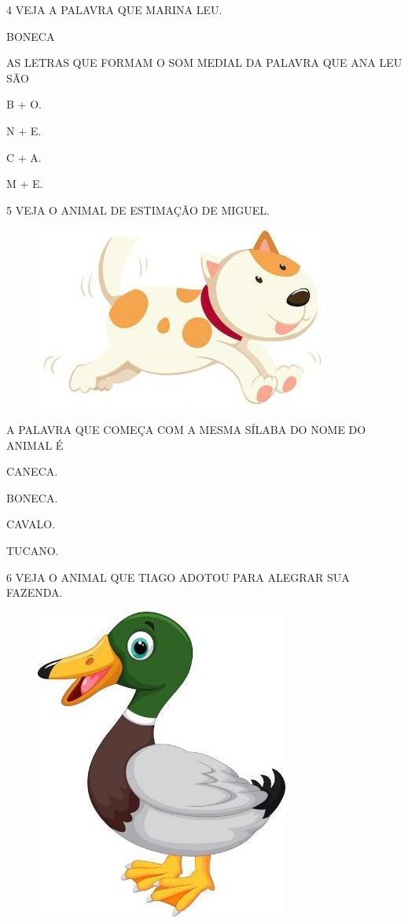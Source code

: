\num{4} VEJA A PALAVRA QUE MARINA LEU.

\begin{myquote}
\centering\large{BONECA}
\end{myquote}

AS LETRAS QUE FORMAM O SOM MEDIAL DA PALAVRA QUE ANA LEU SÃO

\begin{multicols}{4}
\begin{escolha}[itemsep=0pt]
\item B + O.

\item N + E.

\item C + A.

\item M + E.
\end{escolha}
\end{multicols}

\num{5} VEJA O ANIMAL DE ESTIMAÇÃO DE MIGUEL.

\begin{figure}[H]
\centering
\includegraphics[width=.55\textwidth]{media/image214.jpg}
\end{figure}

A PALAVRA QUE COMEÇA COM A MESMA SÍLABA DO NOME DO ANIMAL É 

\begin{multicols}{2}
\begin{escolha}[itemsep=0pt]
\item CANECA.

\item BONECA.

\item CAVALO.

\item TUCANO.
\end{escolha}
\end{multicols}

\num{6} VEJA O ANIMAL QUE TIAGO ADOTOU PARA ALEGRAR SUA FAZENDA.

\begin{figure}[htpb]
\centering
\includegraphics[width=.3\textwidth]{media/image215.jpg}
\end{figure}

